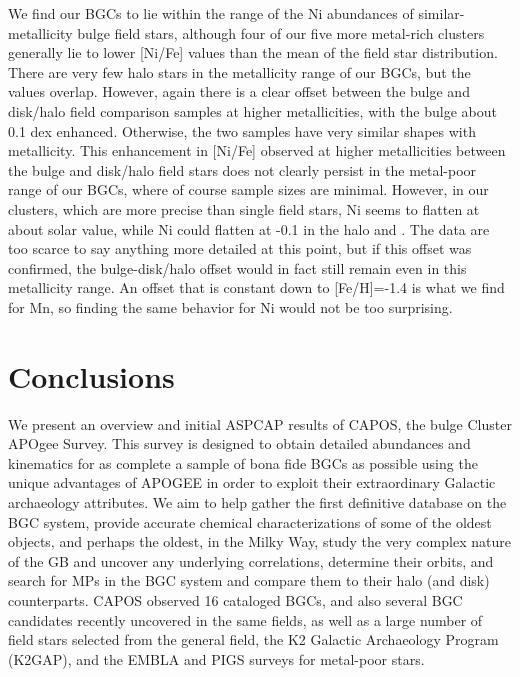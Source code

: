 \documentclass[onecolumn]{aa}
\begin{document}
We find our BGCs to lie within the range of the Ni abundances of similar-metallicity bulge field stars, although four of our five more metal-rich clusters generally lie to lower [Ni/Fe] values than the mean of the field star distribution. 
There are very few halo stars in the metallicity range of our BGCs, but the values overlap. However, again there is a clear offset between the bulge and disk/halo field comparison samples at higher metallicities, with the bulge about 0.1 dex enhanced. Otherwise, the two samples have very similar shapes with metallicity. This enhancement in [Ni/Fe] observed at higher metallicities between the bulge and disk/halo field stars \citep{Lomaeva2019} does not clearly persist in the metal-poor range of our BGCs, where of course sample sizes are minimal. However, in our clusters, which are more precise than single field stars, Ni seems to flatten at about solar value, while Ni could flatten at -0.1 in the halo \citep[see, e.g., Fig.16 of ][]{Bensby2014} and \citep[Fig.8 of][]{Adibekyan12}. The data are too scarce to say anything more detailed at this point, but if this offset was confirmed, the bulge-disk/halo offset would in fact still remain even in this metallicity range. An offset that is constant down to [Fe/H]=-1.4 is what we find for Mn, so finding the same behavior for Ni would not be too surprising.


\section{Conclusions}

We present an overview and initial ASPCAP results of CAPOS, the 
bulge Cluster APOgee Survey. This survey is designed to obtain detailed abundances and kinematics for as complete a sample of bona fide BGCs as possible using the unique advantages of APOGEE in order to exploit their extraordinary Galactic archaeology attributes. We aim to help gather the first definitive database on the BGC system, 
provide accurate chemical characterizations of some of the oldest objects, and perhaps the oldest, in the Milky Way,
study the very complex nature of the GB and uncover any underlying correlations, determine their orbits, and search for MPs in the BGC system and compare them to their halo (and disk) counterparts. CAPOS observed 16 cataloged BGCs, and also several BGC candidates recently uncovered in the same fields, as well as a large number of field stars selected from the general field, the 
K2 Galactic Archaeology Program (K2GAP), and the EMBLA and PIGS surveys for metal-poor stars.
\end{document}
